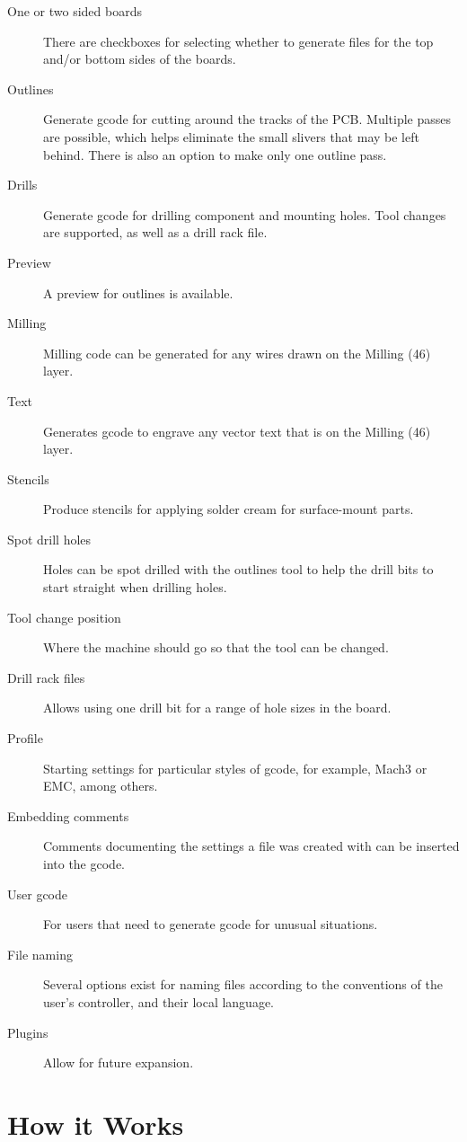 \documentclass[11pt]{book}
\begin{document}
\begin{description}
	\item[One or two sided boards] There are checkboxes for selecting whether to generate files for the top and/or bottom sides of the boards.
	\item[Outlines] Generate gcode for cutting around the tracks of the PCB. Multiple passes are possible, which helps eliminate the small slivers that may be left behind. There is also an option to make only one outline pass.
	\item[Drills] Generate gcode for drilling component and mounting holes. Tool changes are supported, as well as a drill rack file.
	\item[Preview] A preview for outlines is available.
	\item[Milling] Milling code can be generated for any wires drawn on the Milling (46) layer.
	\item[Text] Generates gcode to engrave any vector text that is on the Milling (46) layer.
	\item[Stencils] Produce stencils for applying solder cream for surface-mount parts.
	\item[Spot drill holes] Holes can be spot drilled with the outlines tool to help the drill bits to start straight when drilling holes.
	\item[Tool change position] Where the machine should go so that the tool can be changed.
	\item[Drill rack files] Allows using one drill bit for a range of hole sizes in the board.
	\item[Profile] Starting settings for particular styles of gcode, for example, Mach3 or EMC, among others.
	\item[Embedding comments] Comments documenting the settings a file was created with can be inserted into the gcode.
	\item[User gcode] For users that need to generate gcode for unusual situations.
	\item[File naming] Several options exist for naming files according to the conventions of the user's controller, and their local language.
	\item[Plugins] Allow for future expansion.
\end{description}

%
%
\section{How it Works}\label{sec:HowItWorks}
\end{document}
